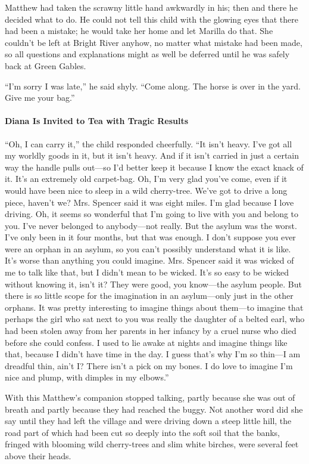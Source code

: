 \documentclass{article}
\begin{document}
Matthew had taken the scrawny little hand awkwardly in his; then and there he decided what to do. He could not tell this child with the glowing eyes that there had been a mistake; he would take her home and let Marilla do that. She couldn't be left at Bright River anyhow, no matter what mistake had been made, so all questions and explanations might as well be deferred until he was safely back at Green Gables.

``I'm sorry I was late,'' he said shyly. ``Come along. The horse is over in the yard. Give me your bag.''

\paragraph{Diana Is Invited to Tea with Tragic Results}
``Oh, I can carry it,'' the child responded cheerfully. ``It isn't heavy. I've got all my worldly goods in it, but it isn't heavy. And if it isn't carried in just a certain way the handle pulls out---so I'd better keep it because I know the exact knack of it. It's an extremely old carpet-bag. Oh, I'm very glad you've come, even if it would have been nice to sleep in a wild cherry-tree. We've got to drive a long piece, haven't we? Mrs. Spencer said it was eight miles. I'm glad because I love driving. Oh, it seems so wonderful that I'm going to live with you and belong to you. I've never belonged to anybody---not really. But the asylum was the worst. I've only been in it four months, but that was enough. I don't suppose you ever were an orphan in an asylum, so you can't possibly understand what it is like. It's worse than anything you could imagine. Mrs. Spencer said it was wicked of me to talk like that, but I didn't mean to be wicked. It's so easy to be wicked without knowing it, isn't it? They were good, you know---the asylum people. But there is so little scope for the imagination in an asylum---only just in the other orphans. It was pretty interesting to imagine things about them---to imagine that perhaps the girl who sat next to you was really the daughter of a belted earl, who had been stolen away from her parents in her infancy by a cruel nurse who died before she could confess. I used to lie awake at nights and imagine things like that, because I didn't have time in the day. I guess that's why I'm so thin---I am dreadful thin, ain't I? There isn't a pick on my bones. I do love to imagine I'm nice and plump, with dimples in my elbows.''

With this Matthew's companion stopped talking, partly because she was out of breath and partly because they had reached the buggy. Not another word did she say until they had left the village and were driving down a steep little hill, the road part of which had been cut so deeply into the soft soil that the banks, fringed with blooming wild cherry-trees and slim white birches, were several feet above their heads.
\end{document}
